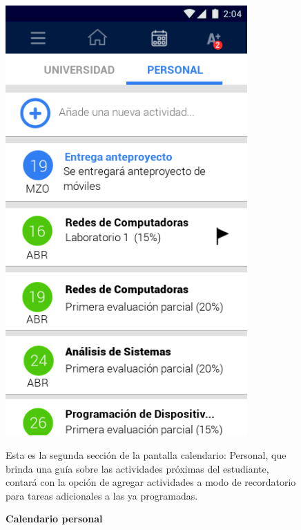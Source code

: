 \documentclass[12pt]{article}
\begin{document}
\begin{figure}[t]
	\begin{minipage}[t]{0.45\textwidth}
		\centering
		\caption{\textbf{Calendario personal}}
		\label{fig:calendario}
		\includegraphics[width=0.825\textwidth]{img/4.png}
	\end{minipage}\hfill
	\begin{minipage}[t]{0.45\textwidth}
		\vspace*{10mm}
		Esta es la segunda sección de la pantalla calendario: Personal, que brinda una guía sobre las actividades próximas del estudiante, contará con la opción de agregar actividades a modo de recordatorio para tareas adicionales a las ya programadas.
	\end{minipage}
	

\end{figure}
\end{document}
